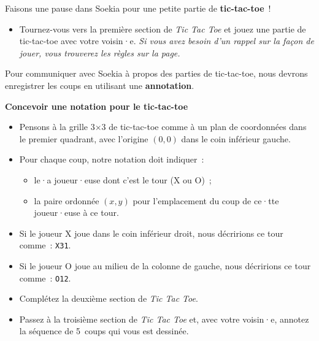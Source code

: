 \documentclass[12pt,a4paper]{article}
\begin{document}
Faisons une pause dans Soekia pour une petite partie de \textbf{tic-tac-toe}~!

\begin{activitybox}
  \begin{itemize}
    \item Tournez-vous vers la première section de \emph{Tic Tac Toe} et jouez une partie de tic-tac-toe avec votre voisin·e. \emph{Si vous avez besoin d'un rappel sur la façon de jouer, vous trouverez les règles sur la page.}
  \end{itemize}
\end{activitybox}

Pour communiquer avec Soekia à propos des parties de tic-tac-toe, nous devrons enregistrer les coups en utilisant une \textbf{annotation}.

\begin{keypointbox}
  \textbf{Concevoir une notation pour le tic-tac-toe}
  \begin{itemize}
    \item Pensons à la grille 3$\times$3 de tic-tac-toe comme à un plan de coordonnées dans le premier quadrant, avec l'origine $(0,0)$ dans le coin inférieur gauche.
    \item Pour chaque coup, notre notation doit indiquer~:
    \begin{itemize}
      \item le·a joueur·euse dont c'est le tour (X ou O)~;
      \item la paire ordonnée $(x, y)$ pour l'emplacement du coup de ce·tte joueur·euse à ce tour.
    \end{itemize}
    \item Si le joueur X joue dans le coin inférieur droit, nous décririons ce tour comme~: \texttt{X31}.
    \item Si le joueur O joue au milieu de la colonne de gauche, nous décririons ce tour comme~: \texttt{O12}.
  \end{itemize}
\end{keypointbox}

\begin{activitybox}
  \begin{itemize}
    \item Complétez la deuxième section de \emph{Tic Tac Toe}.
    \item Passez à la troisième section de \emph{Tic Tac Toe} et, avec votre voisin·e, annotez la séquence de 5~coups qui vous est dessinée.
  \end{itemize}
\end{activitybox}
\end{document}
